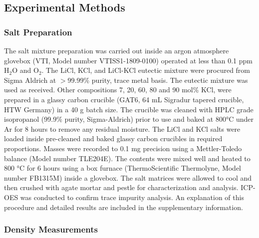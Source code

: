 \documentclass[review]{elsarticle}
\begin{document}
\subsection{Experimental Methods}

\subsubsection{Salt Preparation}

The salt mixture preparation was carried out inside an argon atmosphere glovebox (VTI, Model number VTISS1-1809-0100) operated at less than 0.1 ppm H$_{2}$O and O$_{2}$. The LiCl, KCl, and LiCl-KCl eutectic mixture were procured from Sigma Aldrich at $>$99.99\% purity, trace metal basis. The eutectic mixture was used as received. Other compositions 7, 20, 60, 80 and 90 mol\% KCl, were prepared in a glassy carbon crucible (GAT6, 64 mL Sigradur tapered crucible, HTW Germany) in a 40 g batch size. The crucible was cleaned with HPLC grade isopropanol (99.9\% purity, Sigma-Aldrich) prior to use and baked at 800°C under Ar for 8 hours to remove any residual moisture. The LiCl and KCl salts were loaded inside pre-cleaned and baked glassy carbon crucibles in required proportions. Masses were recorded to 0.1 mg precision using a Mettler-Toledo balance (Model number TLE204E). The contents were mixed well and heated to 800 °C for 6 hours using a box furnace (ThermoScientific Thermolyne, Model number FB1315M) inside a glovebox. The salt matrices were allowed to cool and then crushed with agate mortar and pestle for characterization and analysis. ICP-OES was conducted to confirm trace impurity analysis. An explanation of this procedure and detailed results are included in the supplementary information. 

\subsubsection{Density Measurements} 
\end{document}
